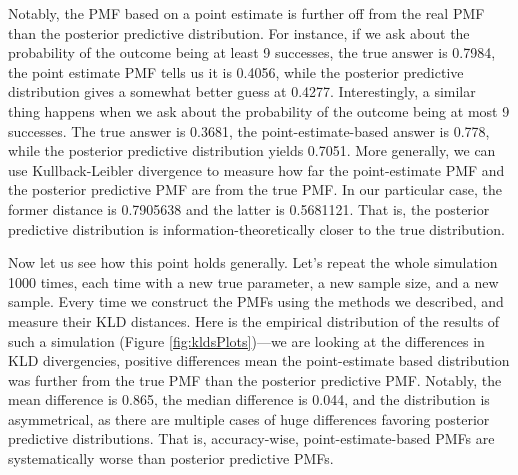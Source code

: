 \documentclass[
  10pt,
  dvipsnames,enabledeprecatedfontcommands]{scrartcl}
\begin{document}
Notably, the PMF based on a point estimate is further off from the real
PMF than the posterior predictive distribution. For instance, if we ask
about the probability of the outcome being at least 9 successes, the
true answer is 0.7984, the point estimate PMF tells us it is 0.4056,
while the posterior predictive distribution gives a somewhat better
guess at 0.4277. Interestingly, a similar thing happens when we ask
about the probability of the outcome being at most 9 successes. The true
answer is 0.3681, the point-estimate-based answer is 0.778, while the
posterior predictive distribution yields 0.7051. More generally, we can
use Kullback-Leibler divergence to measure how far the point-estimate
PMF and the posterior predictive PMF are from the true PMF. In our
particular case, the former distance is 0.7905638 and the latter is
0.5681121. That is, the posterior predictive distribution is
information-theoretically closer to the true distribution.

Now let us see how this point holds generally. Let's repeat the whole
simulation 1000 times, each time with a new true parameter, a new sample
size, and a new sample. Every time we construct the PMFs using the
methods we described, and measure their KLD distances. Here is the
empirical distribution of the results of such a simulation (Figure
\ref{fig:kldsPlots})---we are looking at the differences in KLD
divergencies, positive differences mean the point-estimate based
distribution was further from the true PMF than the posterior predictive
PMF. Notably, the mean difference is 0.865, the median difference is
0.044, and the distribution is asymmetrical, as there are multiple cases
of huge differences favoring posterior predictive distributions. That
is, accuracy-wise, point-estimate-based PMFs are systematically worse
than posterior predictive PMFs.
\end{document}
